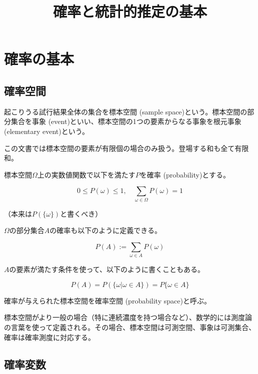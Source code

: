\documentclass[uplatex,dvipdfmx]{jlreq}
\newcommand\term[1]{\textsf{#1}}
\begin{document}
\title{確率と統計的推定の基本}
\maketitle

\section{確率の基本}

\subsection{確率空間}

起こりうる試行結果全体の集合を\term{標本空間 (sample space)}という。標本空間の部分集合を\term{事象 (event)}といい、標本空間の1つの要素からなる事象を\term{根元事象 (elementary event)}という。

この文書では標本空間の要素が有限個の場合のみ扱う。登場する和も全て有限和。

標本空間$\Omega$上の実数値関数で以下を満たす$P$を\term{確率 (probability)}とする。

\begin{equation}
    0 \leq P(\omega) \leq 1,
    \quad \sum_{\omega\in\Omega} P(\omega) = 1
\end{equation}

（本来は$P(\{\omega\})$と書くべき）

$\Omega$の部分集合$A$の確率も以下のように定義できる。

\begin{equation}
    P(A) := \sum_{\omega\in A}P(\omega)
\end{equation}

$A$の要素が満たす条件を使って、以下のように書くこともある。

\begin{equation}
    P(A) = P(\{\omega|\omega\in A\}) = P\{\omega\in A\}
\end{equation}

確率が与えられた標本空間を\term{確率空間 (probability space)}と呼ぶ。

\begin{note}
    標本空間がより一般の場合（特に連続濃度を持つ場合など）、数学的には測度論の言葉を使って定義される。その場合、標本空間は可測空間、事象は可測集合、確率は確率測度に対応する。
\end{note}

\subsection{確率変数}
\end{document}
